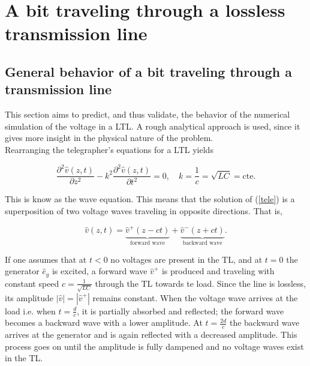 \section{A bit traveling through a lossless transmission line}

\subsection{General behavior of a bit traveling through a transmission line}
This section aims to predict, and thus validate, the behavior of the numerical simulation of the voltage in a LTL. A rough analytical approach is used, since it gives more insight in the physical nature of the problem. \\

Rearranging the telegrapher's equations for a LTL yields

\begin{equation}
\frac{\partial^2\hat{v}(z, t)}{\partial z^2} - k^2\frac{\partial^2 \hat{v}(z, t)}{\partial t^2} = 0, \quad k = \frac{1}{c}= \sqrt{LC} = \mathrm{cte}.
\label{tele}
\end{equation}

This is know as the wave equation. This means that the solution of (\ref{tele}) is a superposition of two voltage waves traveling in opposite directions. That is,

\begin{equation}
\hat{v}(z, t) = \underbrace{\hat{v}^{+}(z - ct)}_{\text{forward wave}} + \underbrace{\hat{v}^{-}(z + ct)}_{\text{backward wave}}.
\end{equation}

If one assumes that at $t < 0$ no voltages are present in the TL, and at $t=0$ the generator $\hat{e}_g$ is excited, a forward wave $\hat{v}^{+}$ is produced and traveling with constant speed $c = \frac{1}{\sqrt{LC}}$ through the TL towards te load. Since the line is lossless, its amplitude $|\hat{v}| = |\hat{v}^{+}|$ remains constant. When the voltage wave arrives at the load i.e. when $t = \frac{d}{c}$, it is partially absorbed and reflected; the forward wave becomes a backward wave with a lower amplitude. At $t = \frac{2d}{c}$ the backward wave arrives at the generator and is again reflected with a decreased amplitude. This process goes on until the amplitude is fully dampened and no voltage waves exist in the TL.


